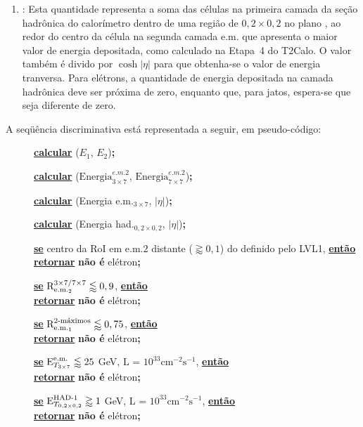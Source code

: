 \begin{enumerate}
\item \textbf{\ethad}: Esta quantidade representa a soma das células na
primeira camada da seção hadrônica do calorímetro dentro de uma região de $0,2
\times 0,2$ no plano \ep, ao redor do centro da célula na segunda camada
e.m. que apresenta o maior valor de energia depositada, como calculado na
Etapa~4 do T2Calo. O valor também é divido por $\cosh{|\eta|}$ para que
obtenha-se o valor de energia tranversa. Para elétrons, a quantidade de
energia depositada na camada hadrônica deve ser próxima de zero, enquanto que,
para jatos, espera-se que seja diferente de zero.
\end{enumerate}

A seqüência discriminativa está representada a seguir, em pseudo-código:

\newcommand{\textbu}[1]{\textbf{\underline{#1}}}
\newcommand{\IF}[1]{\textbu{se} #1, \textbu{então}}
\newcommand{\RETURN}[1]{\\ \textbu{retornar} #1\textbf{;}}
\newcommand{\EVALTWO}[3]{\textbu{calcular} #1(#2, #3)\textbf{;}}
\newcommand{\lumihi}{\ensuremath{10^{33} \text{cm}^{-2}\text{s}^{-1}}}

\begin{description}
\item[] \EVALTWO{\eratio}{$E_1$}{$E_2$}
\item[] \EVALTWO{\rcore}{$\text{Energia}^{e.m.2}_{3\times7}$}{$\text{Energia}^{e.m.2}_{7\times7}$}
\item[] \EVALTWO{\etem}{Energia e.m.$_{3\times7}$}{$|\eta|$}
\item[] \EVALTWO{\ethad}{Energia had.$_{0,2\times0,2}$}{$|\eta|$}

\item[] \IF{centro da RoI em e.m.2 distante ($\gtrapprox 0,1$) do
definido pelo LVL1}
	\RETURN{\textbf{não é} elétron}

\item[] \IF{$\rcore \lessapprox 0,9$}
	\RETURN{\textbf{não é} elétron}

\item[] \IF{$\eratio \lessapprox 0,75$}
	\RETURN{\textbf{não é} elétron}

\item[] \IF{$\etem \lessapprox 25$ GeV, L = \lumihi}
	\RETURN{\textbf{não é} elétron}

\item[] \IF{$\ethad \gtrapprox 1$ GeV, L = \lumihi}
	\RETURN{\textbf{não é} elétron}

\end{description}

